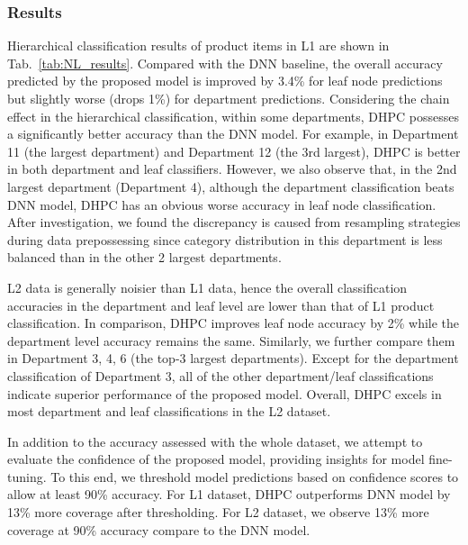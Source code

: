 \documentclass[11pt,dvipsnames]{article}
\begin{document}
\subsubsection{Results}
 Hierarchical classification results of product items in L1 are shown in Tab.~\ref{tab:NL_results}. Compared with the DNN baseline, the overall accuracy predicted by the proposed model is improved by 3.4\% for leaf node predictions but slightly worse (drops 1\%) for department predictions. Considering the chain effect in the hierarchical classification, within some departments, DHPC possesses a significantly better accuracy than the DNN model. For example, in Department 11 (the largest department) and Department 12 (the 3rd largest), DHPC is better in both department and leaf classifiers. However, we also observe that, in the 2nd largest department (Department 4), although the department classification beats DNN model, DHPC has an obvious worse accuracy in leaf node classification. After investigation, we found the discrepancy is caused from resampling strategies during data prepossessing since category distribution in this department is less balanced than in the other 2 largest departments. 

 L2 data is generally noisier than L1 data, hence the overall classification accuracies in the department and leaf level are lower than that of L1 product classification. In comparison, DHPC improves leaf node accuracy by 2\% while the department level accuracy remains the same. Similarly, we further compare them in Department 3, 4, 6 (the top-3 largest departments). Except for the department classification of Department 3, all of the other department/leaf classifications indicate superior performance of the proposed model. Overall, DHPC excels in most department and leaf classifications in the L2 dataset.

 In addition to the accuracy assessed with the whole dataset, we attempt to evaluate the confidence of the proposed model, providing insights for model fine-tuning. To this end, we threshold model predictions based on confidence scores to allow at least 90\% accuracy. For L1 dataset, DHPC outperforms DNN model by 13\% more coverage after thresholding. For L2 dataset, we observe 13\% more coverage at 90\% accuracy compare to the DNN model. 
\end{document}
